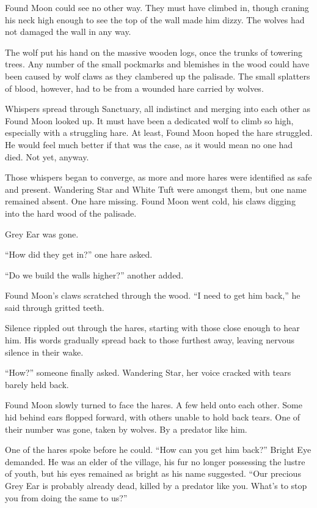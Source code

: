 Found Moon could see no other way. They must have climbed in, though craning his neck high enough to see the top of the wall made him dizzy. The wolves had not damaged the wall in any way.

The wolf put his hand on the massive wooden logs, once the trunks of towering trees. Any number of the small pockmarks and blemishes in the wood could have been caused by wolf claws as they clambered up the palisade. The small splatters of blood, however, had to be from a wounded hare carried by wolves.

Whispers spread through Sanctuary, all indistinct and merging into each other as Found Moon looked up. It must have been a dedicated wolf to climb so high, especially with a struggling hare. At least, Found Moon hoped the hare struggled. He would feel much better if that was the case, as it would mean no one had died. Not yet, anyway.

Those whispers began to converge, as more and more hares were identified as safe and present. Wandering Star and White Tuft were amongst them, but one name remained absent. One hare missing. Found Moon went cold, his claws digging into the hard wood of the palisade.

Grey Ear was gone.

``How did they get in?'' one hare asked.

``Do we build the walls higher?'' another added.

Found Moon's claws scratched through the wood. ``I need to get him back,'' he said through gritted teeth.

Silence rippled out through the hares, starting with those close enough to hear him. His words gradually spread back to those furthest away, leaving nervous silence in their wake.

``How?'' someone finally asked. Wandering Star, her voice cracked with tears barely held back.

Found Moon slowly turned to face the hares. A few held onto each other. Some hid behind ears flopped forward, with others unable to hold back tears. One of their number was gone, taken by wolves. By a predator like him.

One of the hares spoke before he could. ``How can you get him back?'' Bright Eye demanded. He was an elder of the village, his fur no longer possessing the lustre of youth, but his eyes remained as bright as his name suggested. ``Our precious Grey Ear is probably already dead, killed by a predator like you. What's to stop you from doing the same to us?''

